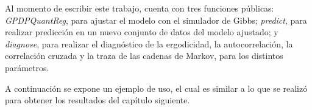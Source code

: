 Al momento de escribir este trabajo, cuenta con tres funciones p\'ublicas: \textit{GPDPQuantReg}, para ajustar el modelo con el simulador de Gibbs; \textit{predict}, para realizar predicci\'on en un nuevo conjunto de datos del modelo ajustado; y \textit{diagnose}, para realizar el diagn\'ostico de la ergodicidad, la autocorrelaci\'on, la correlaci\'on cruzada y la traza de las cadenas de Markov, para los distintos par\'ametros.

A continuaci\'on se expone un ejemplo de uso, el cual es similar a lo que se realiz\'o para obtener los resultados del cap\'itulo siguiente.



\newpage